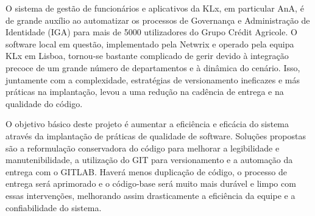 
%

O sistema de gestão de funcionários e aplicativos da KLx, em particular AnA, é de grande auxílio ao automatizar os processos de Governança e Administração de Identidade (IGA) para mais de 5000 utilizadores do Grupo Crédit Agricole. O software local em questão, implementado pela Netwrix e operado pela equipa KLx em Lisboa, tornou-se bastante complicado de gerir devido à integração precoce de um grande número de departamentos e à dinâmica do cenário. Isso, juntamente com a complexidade, estratégias de versionamento ineficazes e más práticas na implantação, levou a uma redução na cadência de entrega e na qualidade do código.

O objetivo básico deste projeto é aumentar a eficiência e eficácia do sistema através da implantação de práticas de qualidade de software. Soluções propostas são a reformulação conservadora do código para melhorar a legibilidade e manutenibilidade, a utilização do GIT para versionamento e a automação da entrega com o GITLAB. Haverá menos duplicação de código, o processo de entrega será aprimorado e o código-base será muito mais durável e limpo com essas intervenções, melhorando assim drasticamente a eficiência da equipe e a confiabilidade do sistema.

